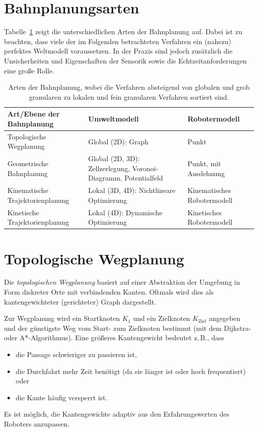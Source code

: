 	\section{Bahnplanungsarten}
		Tabelle~\ref{tab:pathplanningtypes} zeigt die unterschiedlichen Arten der Bahnplanung auf. Dabei ist zu beachten, dass viele der im Folgenden betrachteten Verfahren ein (nahezu) perfektes Weltmodell voraussetzen. In der Praxis sind jedoch zusätzlich die Unsicherheiten und Eigenschaften der Sensorik sowie die Echtzeitanforderungen eine große Rolle.
		
		\begin{table}
			\centering
			\begin{tabular}{l|p{6cm}|p{4cm}}
				\textbf{Art/Ebene der Bahnplanung} & \textbf{Umweltmodell}                                           & \textbf{Robotermodell}      \\ \hline
				Topologische Wegplanung            & Global (2D): Graph                                              & Punkt                       \\ \hline
				Geometrische Bahnplanung           & Global (2D, 3D): Zellzerlegung, Voronoi-Diagramm, Potentialfeld & Punkt, \ggf mit Ausdehnung  \\ \hline
				Kinematische Trajektorienplanung   & Lokal (3D, 4D): \newline Nichtlineare Optimierung               & Kinematisches Robotermodell \\ \hline
				Kinetische Trajektorienplanung     & Lokal (4D): \newline Dynamische Optimierung                     & Kinetisches Robotermodell
			\end{tabular}
			\caption{Arten der Bahnplanung, wobei die Verfahren absteigend von globalen und grob granularen zu lokalen und fein granularen Verfahren sortiert sind.}
			\label{tab:pathplanningtypes}
		\end{table}

	\section{Topologische Wegplanung}
		Die \emph{topologischen Wegplanung} basiert auf einer Abstraktion der Umgebung in Form diskreter Orte mit verbindenden Kanten. Oftmals wird dies als kantengewichteter (\ggf gerichteter) Graph dargestellt.
		
		Zur Wegplanung wird ein Startknoten \(K_1\) und ein Zielknoten \(K_\text{Ziel}\) angegeben und der günstigste Weg vom Start- zum Zielknoten bestimmt (\zB mit dem Dijkstra- oder A*-Algorithmus). Eine größeres Kantengewicht bedeutet z.\,B., dass
		\begin{itemize}
			\item die Passage schwieriger zu passieren ist,
			\item die Durchfahrt mehr Zeit benötigt (\zB da sie länger ist oder hoch frequentiert) oder
			\item die Kante häufig versperrt ist.
		\end{itemize}
		Es ist möglich, die Kantengewichte adaptiv aus den Erfahrungswerten des Roboters anzupassen.

